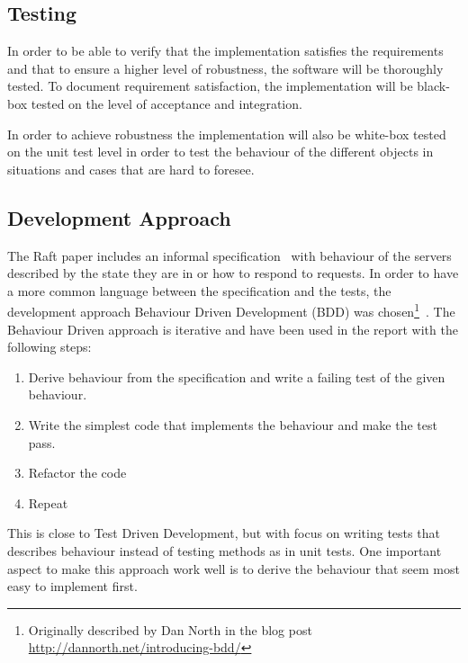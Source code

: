 
\subsection{Testing} %
\label{sub:testing}

In order to be able to verify that the implementation satisfies the requirements and that to ensure a higher level of robustness, the software will be thoroughly tested. To document requirement satisfaction, the implementation will be black-box tested on the level of acceptance and integration.

In order to achieve robustness the implementation will also be white-box tested on the unit test level in order to test the behaviour of the different objects in situations and cases that are hard to foresee.


\subsection{Development Approach}
\label{sub:development_approach}

The Raft paper includes an informal specification~\cite[page~4]{Raft} with behaviour of the servers described by the state they are in or how to respond to requests. In order to have a more common language between the specification and the tests, the development approach Behaviour Driven Development (BDD) was chosen\footnote{Originally described by Dan North in the blog post \url{http://dannorth.net/introducing-bdd/}}~\cite{bddpaper}. The Behaviour Driven approach is iterative and have been used in the report with the following steps:

\begin{enumerate}
    \item Derive behaviour from the specification and write a failing test of the given behaviour.
    \item Write the simplest code that implements the behaviour and make the test pass.
    \item Refactor the code
    \item Repeat
\end{enumerate}

This is close to Test Driven Development, but with focus on writing tests that describes behaviour instead of testing methods as in unit tests.
One important aspect to make this approach work well is to derive the behaviour that seem most easy to implement first.

